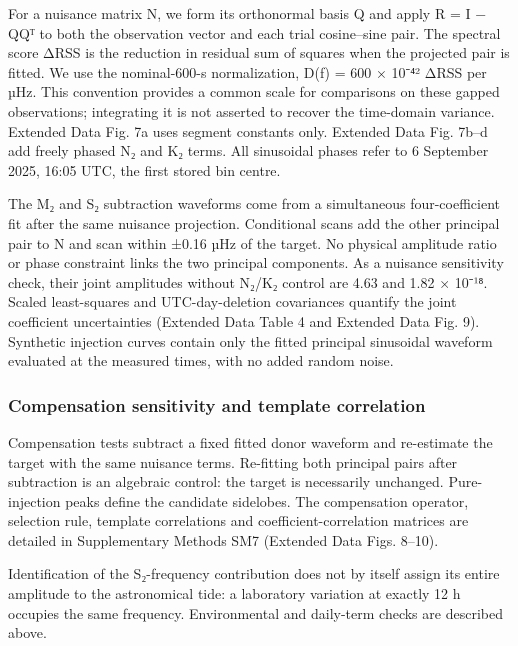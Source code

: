 \documentclass[
  11pt,
  a4paper,
]{article}
\begin{document}
For a nuisance matrix N, we form its orthonormal basis Q and apply R = I
− QQᵀ to both the observation vector and each trial cosine--sine pair.
The spectral score ΔRSS is the reduction in residual sum of squares when
the projected pair is fitted. We use the nominal-600-s normalization,
D(f) = 600 × 10⁻⁴² ΔRSS per µHz. This convention provides a common scale
for comparisons on these gapped observations; integrating it is not
asserted to recover the time-domain variance. Extended Data Fig. 7a uses
segment constants only. Extended Data Fig. 7b--d add freely phased N₂
and K₂ terms. All sinusoidal phases refer to 6 September 2025, 16:05
UTC, the first stored bin centre.

The M₂ and S₂ subtraction waveforms come from a simultaneous
four-coefficient fit after the same nuisance projection. Conditional
scans add the other principal pair to N and scan within ±0.16 µHz of the
target. No physical amplitude ratio or phase constraint links the two
principal components. As a nuisance sensitivity check, their joint
amplitudes without N₂/K₂ control are 4.63 and 1.82 × 10⁻¹⁸. Scaled
least-squares and UTC-day-deletion covariances quantify the joint
coefficient uncertainties (Extended Data Table 4 and Extended Data Fig.
9). Synthetic injection curves contain only the fitted principal
sinusoidal waveform evaluated at the measured times, with no added
random noise.

\hypertarget{compensation-sensitivity-and-template-correlation}{%
\subsubsection{Compensation sensitivity and template
correlation}\label{compensation-sensitivity-and-template-correlation}}

Compensation tests subtract a fixed fitted donor waveform and
re-estimate the target with the same nuisance terms. Re-fitting both
principal pairs after subtraction is an algebraic control: the target is
necessarily unchanged. Pure-injection peaks define the candidate
sidelobes. The compensation operator, selection rule, template
correlations and coefficient-correlation matrices are detailed in
Supplementary Methods SM7 (Extended Data Figs. 8--10).

Identification of the S₂-frequency contribution does not by itself
assign its entire amplitude to the astronomical tide: a laboratory
variation at exactly 12 h occupies the same frequency. Environmental and
daily-term checks are described above.
\end{document}
